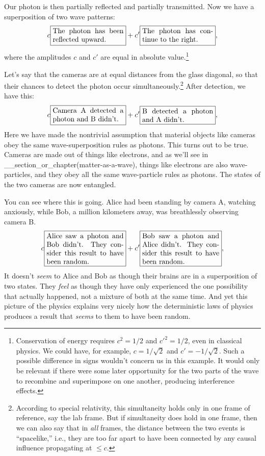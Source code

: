 Our photon is then partially reflected and partially transmitted. Now we have
a superposition of two wave patterns:
\begin{equation*}
 c\fbox{\parbox{35mm}{The photon has been reflected upward.}}
+c'\fbox{\parbox{35mm}{The photon has continue to the right.}},
\end{equation*}
where the amplitudes $c$ and $c'$ are equal in absolute value.\footnote{
Conservation of energy requires $c^2=1/2$ and $c'^2=1/2$,
even in classical physics. We could have, for
example, $c=1/\sqrt{2}$ and $c'=-1/\sqrt{2}$. Such a possible difference in
signs wouldn't concern us in this example. It would only be relevant if there
were some later opportunity for the two parts of the wave to recombine and
superimpose on one another, producing interference effects.}

Let's say that the cameras are at equal distances from the glass diagonal,
so that their chances to detect the photon occur simultaneously.\footnote{
According to special relativity, this simultaneity holds only in one frame
of reference, say the lab frame. But if simultaneity does hold in one frame,
then we can also say that in \emph{all} frames, the distance between the two
events is ``spacelike,'' i.e., they are too far apart to have been connected
by any causal influence propagating at $\le c$.
}
After detection, we have this:
\begin{equation*}
 c\fbox{\parbox{35mm}{Camera A detected a photon and B didn't.}}
+c'\fbox{\parbox{35mm}{B detected a photon and A didn't.}},
\end{equation*}
Here we have made the nontrivial assumption that material objects like
cameras obey the same wave-superposition rules as photons. This turns out
to be true. Cameras are made out of things like electrons,
and as we'll see in __section_or_chapter(matter-as-a-wave), things like
electrons are also wave-particles, and they obey all the same wave-particle rules
as photons. The states of the two cameras are now entangled.

You can see where this is going.  Alice had been standing by camera A,
watching anxiously, while Bob, a million kilometers away, was
breathlessly observing camera B. 
\begin{equation*}
 c\fbox{\parbox{38mm}{Alice saw a photon and Bob didn't. They consider this result to have been random.}}
+c'\fbox{\parbox{38mm}{Bob saw a photon and Alice didn't. They consider this result to have been random.}},
\end{equation*}
It doesn't \emph{seem} to Alice and Bob as though their brains are in
a superposition of two states. They \emph{feel} as though they have only
experienced the one possibility that actually happened, not a mixture of
both at the same time. And yet this picture of the physics explains very nicely
how the deterministic laws of physics produces a result that \emph{seems}
to them to have been random.

